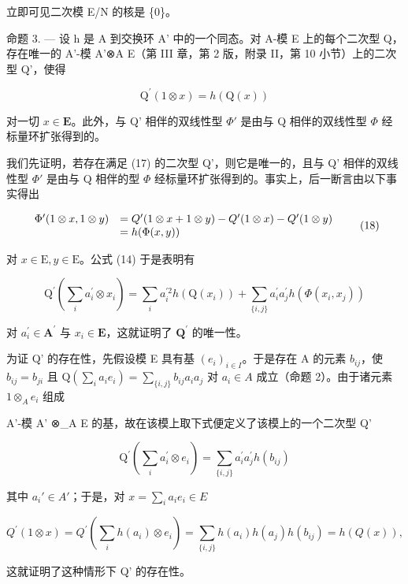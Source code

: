 立即可见二次模 E/N 的核是 \{0\}。

命题 3. --- 设 h 是 A 到交换环 A' 中的一个同态。对 A-模 E 上的每个二次型 Q，存在唯一的 A'-模 A'⊗A E（第 III 章，第 2 版，附录 II，第 10 小节）上的二次型 Q'，使得

\[
\mathrm{Q} ^ {\prime} (1 \otimes x) = h (\mathrm{Q} (x))\tag{17}
\]

对一切 \(x \in \mathbf{E}\)。此外，与 Q' 相伴的双线性型 \(\Phi'\) 是由与 Q 相伴的双线性型 \(\Phi\) 经标量环扩张得到的。

我们先证明，若存在满足 (17) 的二次型 Q'，则它是唯一的，且与 Q' 相伴的双线性型 \(\Phi'\) 是由与 Q 相伴的型 \(\Phi\) 经标量环扩张得到的。事实上，后一断言由以下事实得出

\[
\begin{array}{r l} \Phi^ {\prime} (1 \otimes x, 1 \otimes y) & = Q ^ {\prime} (1 \otimes x + 1 \otimes y) - Q ^ {\prime} (1 \otimes x) - Q ^ {\prime} (1 \otimes y) \\ & = h (\Phi (x, y)) \end{array}\tag{18}
\]

对 \(x \in \mathrm{E}, y \in \mathrm{E}\)。公式 (14) 于是表明有

\[
\mathrm{Q} ^ {\prime} \left(\sum_ {i} a _ {i} ^ {\prime} \otimes x _ {i}\right) = \sum_ {i} a _ {i} ^ {\prime 2} h (\mathrm{Q} (x _ {i})) + \sum_ {\{i, j \}} a _ {i} ^ {\prime} a _ {j} ^ {\prime} h (\Phi (x _ {i}, x _ {j}))\tag{19}
\]

对 \(a_{i}^{\prime}\in\mathbf{A}^{\prime}\) 与 \(x_{i}\in\mathbf{E}\)，这就证明了 \(\mathbf{Q}^{\prime}\) 的唯一性。

为证 Q' 的存在性，先假设模 E 具有基 \((e_{i})_{i\in I}\)。于是存在 A 的元素 \(b_{ij}\)，使 \(b_{ij}=b_{ji}\) 且 \(\mathrm{Q}(\sum_{i}a_{i}e_{i})=\sum_{\{i,j\}}b_{ij}a_{i}a_{j}\) 对 \(a_{i}\in A\) 成立（命题 2）。由于诸元素 \(1\otimes_{A}e_{i}\) 组成

A'-模 A' ⊗\_A E 的基，故在该模上取下式便定义了该模上的一个二次型 Q'

\[
\mathrm{Q} ^ {\prime} (\sum_ {i} a _ {i} ^ {\prime} \otimes e _ {i}) = \sum_ {\{i, j \}} a _ {i} ^ {\prime} a _ {j} ^ {\prime} h (b _ {i j})\tag{20}
\]

其中 \(a_i' \in A'\)；于是，对 \(x = \sum_{i} a_i e_i \in E\)

\[
Q ^ {\prime} (1 \otimes x) = Q ^ {\prime} (\sum_ {i} h (a _ {i}) \otimes e _ {i}) = \sum_ {\{i, j \}} h (a _ {i}) h (a _ {j}) h (b _ {i j}) = h (Q (x)),\tag{21}
\]

这就证明了这种情形下 Q' 的存在性。

